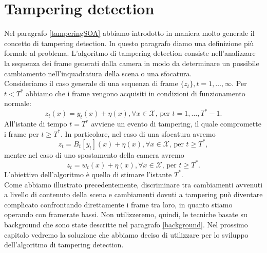 \section{Tampering detection}
Nel paragrafo \ref{tamperingSOA} abbiamo introdotto in maniera molto generale il concetto di tampering detection. 
In questo paragrafo diamo una definizione pi\`u formale al problema.
L'algoritmo di tampering detection consiste nell'analizzare la sequenza dei frame generati dalla camera in modo da determinare un possibile cambiamento nell'inquadratura della scena o una sfocatura.\\
Consideriamo il caso generale di una sequenza di frame $\{z_t\}, t=1,\dots,\infty$. 
Per $t<T^*$ abbiamo che i frame vengono acquisiti in condizioni di funzionamento normale:
\[ z_t(x)=y_t(x) + \eta(x), \forall x \in \mathcal{X} \mbox{, per } t=1,\dots , T^*-1. \] 
All'istante di tempo $t = T^*$ avviene un evento di tampering, il quale compromette i frame per $t\geq T^*$.  
In particolare, nel caso di una sfocatura avremo
\[ z_t = B_t[y_t](x) + \eta(x), \forall x \in \mathcal{X} \mbox{, per } t \geq T^*,\]
mentre nel caso di uno spostamento della camera avremo
\[ z_t = w_t(x) + \eta(x), \forall x \in \mathcal{X} \mbox{, per } t \geq T^*. \]
L'obiettivo dell'algoritmo \`e quello di stimare l'istante $T^*$. \\
Come abbiamo illustrato precedentemente, discriminare tra cambiamenti avvenuti a livello di contenuto della scena e cambiamenti dovuti a tampering pu\`o diventare complicato confrontando direttamente i frame tra loro, in quanto stiamo operando con framerate bassi.
Non utilizzeremo, quindi, le tecniche basate su background che sono state descritte nel paragrafo \ref{background}.
Nel prossimo capitolo vedremo la soluzione che abbiamo deciso di utilizzare per lo sviluppo dell'algoritmo di tampering detection. 
